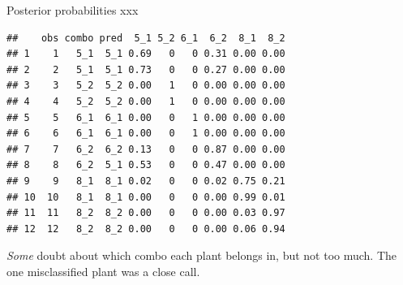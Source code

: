 \documentclass[ignorenonframetext,]{beamer}
\newenvironment{Shaded}{\begin{snugshade}}{\end{snugshade}}
\newcommand{\DataTypeTok}[1]{\textcolor[rgb]{0.13,0.29,0.53}{#1}}
\newcommand{\DecValTok}[1]{\textcolor[rgb]{0.00,0.00,0.81}{#1}}
\newcommand{\KeywordTok}[1]{\textcolor[rgb]{0.13,0.29,0.53}{\textbf{#1}}}
\newcommand{\NormalTok}[1]{#1}
\newcommand{\OperatorTok}[1]{\textcolor[rgb]{0.81,0.36,0.00}{\textbf{#1}}}
\newcommand{\StringTok}[1]{\textcolor[rgb]{0.31,0.60,0.02}{#1}}
\begin{document}
\begin{frame}[fragile]{Posterior probabilities xxx}
\protect\hypertarget{posterior-probabilities-xxx}{}

\scriptsize

\begin{Shaded}
\end{Shaded}

\begin{verbatim}
##    obs combo pred  5_1 5_2 6_1  6_2  8_1  8_2
## 1    1   5_1  5_1 0.69   0   0 0.31 0.00 0.00
## 2    2   5_1  5_1 0.73   0   0 0.27 0.00 0.00
## 3    3   5_2  5_2 0.00   1   0 0.00 0.00 0.00
## 4    4   5_2  5_2 0.00   1   0 0.00 0.00 0.00
## 5    5   6_1  6_1 0.00   0   1 0.00 0.00 0.00
## 6    6   6_1  6_1 0.00   0   1 0.00 0.00 0.00
## 7    7   6_2  6_2 0.13   0   0 0.87 0.00 0.00
## 8    8   6_2  5_1 0.53   0   0 0.47 0.00 0.00
## 9    9   8_1  8_1 0.02   0   0 0.02 0.75 0.21
## 10  10   8_1  8_1 0.00   0   0 0.00 0.99 0.01
## 11  11   8_2  8_2 0.00   0   0 0.00 0.03 0.97
## 12  12   8_2  8_2 0.00   0   0 0.00 0.06 0.94
\end{verbatim}

\normalsize

\emph{Some} doubt about which combo each plant belongs in, but not too
much. The one misclassified plant was a close call.

\end{frame}
\end{document}
